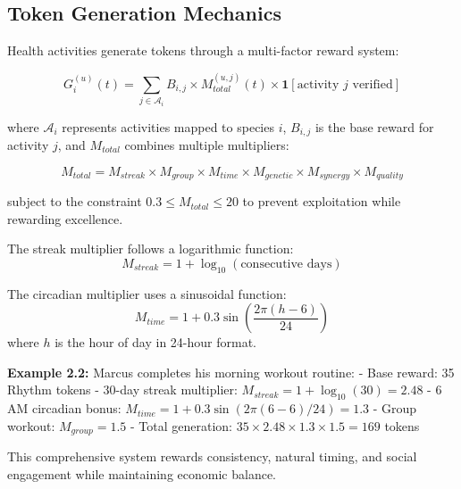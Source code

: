 \documentclass[11pt,letterpaper]{article}
\begin{document}
\subsection{Token Generation Mechanics}

Health activities generate tokens through a multi-factor reward system:

\begin{equation}
G_i^{(u)}(t) = \sum_{j \in \mathcal{A}_i} B_{i,j} \times M_{total}^{(u,j)}(t) \times \mathbf{1}[\text{activity } j \text{ verified}]
\end{equation}

where $\mathcal{A}_i$ represents activities mapped to species $i$, $B_{i,j}$ is the base reward for activity $j$, and $M_{total}$ combines multiple multipliers:

\begin{equation}
M_{total} = M_{streak} \times M_{group} \times M_{time} \times M_{genetic} \times M_{synergy} \times M_{quality}
\end{equation}

subject to the constraint $0.3 \leq M_{total} \leq 20$ to prevent exploitation while rewarding excellence.

The streak multiplier follows a logarithmic function:
\begin{equation}
M_{streak} = 1 + \log_{10}(\text{consecutive days})
\end{equation}

The circadian multiplier uses a sinusoidal function:
\begin{equation}
M_{time} = 1 + 0.3\sin\left(\frac{2\pi(h - 6)}{24}\right)
\end{equation}
where $h$ is the hour of day in 24-hour format.

\textbf{Example 2.2:} Marcus completes his morning workout routine:
- Base reward: 35 Rhythm tokens
- 30-day streak multiplier: $M_{streak} = 1 + \log_{10}(30) = 2.48$
- 6 AM circadian bonus: $M_{time} = 1 + 0.3\sin(2\pi(6-6)/24) = 1.3$
- Group workout: $M_{group} = 1.5$
- Total generation: $35 \times 2.48 \times 1.3 \times 1.5 = 169$ tokens

This comprehensive system rewards consistency, natural timing, and social engagement while maintaining economic balance.
\end{document}
